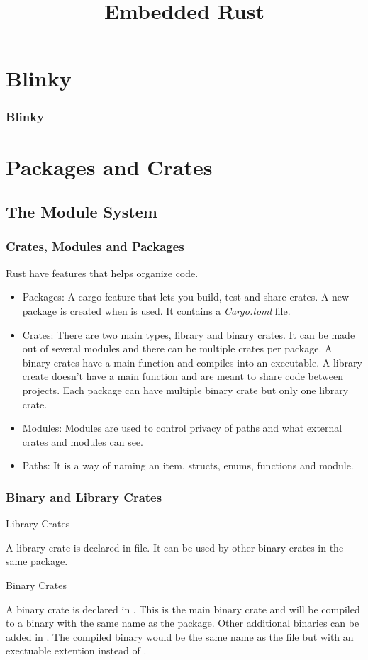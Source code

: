\documentclass{beamer}
\title{Embedded Rust}
\begin{document}
\begin{frame}
  \titlepage{}
\end{frame}

\section{Blinky}
\begin{frame}
  \frametitle{Blinky}

\end{frame}

\section{Packages and Crates}
\subsection{The Module System}
\begin{frame} \frametitle{Crates, Modules and Packages} Rust have features that helps organize code.

  \begin{itemize}
    \item{Packages: A cargo feature that lets you build, test and share crates. A new package is created when  is used. It contains a \emph{Cargo.toml} file.}
    \item{Crates: There are two main types, library and binary crates. It can be made out of several modules and there can be multiple crates per package. A binary crates have a main function and compiles into an executable. A library create doesn't have a main function and are meant to share code between projects. Each package can have multiple binary crate but only one library crate.}
    \item{Modules: Modules are used to control privacy of paths and what external crates and modules can see.}
    \item{Paths: It is a way of naming an item, structs, enums, functions and module.}
  \end{itemize}
\end{frame}

\begin{frame}
  \frametitle{Binary and Library Crates}
  {\fontsize{15pt}{18pt}\selectfont Library Crates}

  A library crate is declared in  file. It can be used by other binary crates in the same package.

  {\fontsize{15pt}{18pt}\selectfont Binary Crates}

  A binary crate is declared in . This is the main binary crate and will be compiled to a binary with the same name as the package. Other additional binaries can be added in . The compiled binary would be the same name as the file but with an exectuable extention instead of .
\end{frame}
\end{document}
